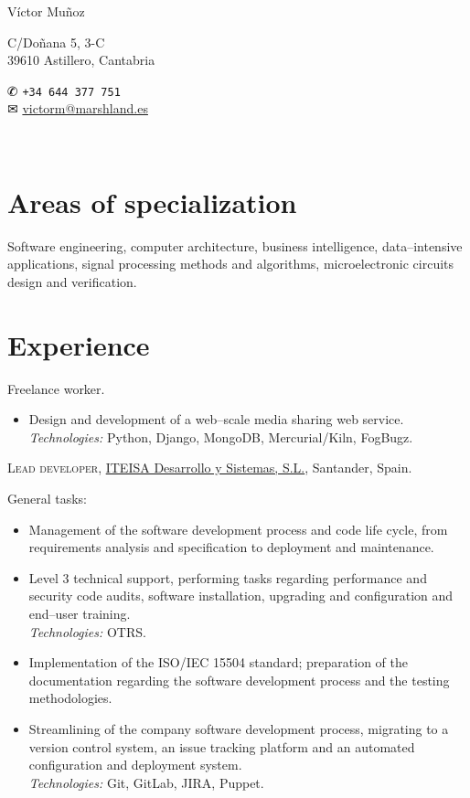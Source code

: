 \documentclass[11pt]{article}
\newcommand{\years}[1]{\marginnote{\scriptsize #1}}
\begin{document}
\begin{minipage}[m]{.3\textwidth}
	{\LARGE Víctor Muñoz}
\end{minipage}
\begin{minipage}[m]{.35\textwidth}
	C/Doñana 5, 3-C\\
	39610 Astillero, Cantabria
\end{minipage}
\begin{minipage}[m]{.3\textwidth}
	{\dingbats ✆} \texttt{+34 644 377 751}\\
	{\dingbats ✉} \href{mailto:victorm@marshland.es}
	                    {victorm@marshland.es}
\end{minipage}\\[.05cm]


\section*{Areas of specialization} %
Software engineering, computer architecture, business intelligence, data--intensive applications, signal processing methods and algorithms, microelectronic circuits design and verification.


\section*{Experience}  %
\noindent
\years{2012--present}Freelance worker.
\begin{itemize}
	\item  Design and development of a web--scale media sharing web service.\\
	\textit{Technologies:} Python, Django, MongoDB, Mercurial/Kiln, FogBugz.
\end{itemize}

\years{2011--2013}\textsc{Lead developer}, \href{http://www.iteisa.com}{ITEISA Desarrollo y Sistemas, S.L.}, Santander, Spain.

General tasks:
\begin{itemize}
	\item  Management of the software development process and code life cycle, from requirements analysis and specification to deployment and maintenance.
	\item  Level 3 technical support, performing tasks regarding performance and security code audits, software installation, upgrading and configuration and end--user training.\\
	\textit{Technologies:} OTRS.
	\item  Implementation of the ISO/IEC 15504 standard; preparation of the documentation regarding the software development process and the testing methodologies.
	\item  Streamlining of the company software development process, migrating to a version control system, an issue tracking platform and an automated configuration and deployment system.\\
	\textit{Technologies:} Git, GitLab, JIRA, Puppet.
\end{itemize}
\end{document}
